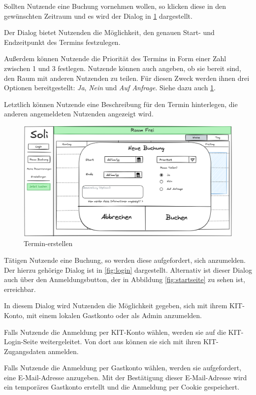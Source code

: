 Sollten Nutzende eine Buchung vornehmen wollen, so klicken diese in den gewünschten Zeitraum
und es wird der Dialog in \ref{fig:buchung} dargestellt.

Der Dialog bietet Nutzenden die Möglichkeit, den genauen Start- und Endzeitpunkt des Termins festzulegen.

Außerdem können Nutzende die Priorität des Termins in Form einer Zahl zwischen 1 und 3 festlegen.
Nutzende können auch angeben, ob sie bereit sind, den Raum mit anderen Nutzenden zu teilen.
Für diesen Zweck werden ihnen drei Optionen bereitgestellt: \textit{Ja}, \textit{Nein} und \textit{Auf Anfrage}.
Siehe dazu auch \ref{fig:buchung}.

Letztlich können Nutzende eine Beschreibung für den Termin hinterlegen, die anderen angemeldeten Nutzenden angezeigt wird.

\begin{figure}[ht]
    \centering
    \includegraphics[width=\textwidth]{figures/ui/buchungsdialog}
    \caption{Termin-erstellen}
    \label{fig:buchung}
\end{figure}
\clearpage

Tätigen Nutzende eine Buchung, so werden diese aufgefordert, sich anzumelden.
Der hierzu gehörige Dialog ist in \ref{fig:login} dargestellt.
Alternativ ist dieser Dialog auch über den Anmeldungsbutton, der in Abbildung \ref{fig:startseite} zu sehen ist, erreichbar.

In diesem Dialog wird Nutzenden die Möglichkeit gegeben, sich mit ihrem KIT-Konto, mit einem lokalen Gastkonto oder als Admin anzumelden.

Falls Nutzende die Anmeldung per KIT-Konto wählen, werden sie auf die KIT-Login-Seite weitergeleitet.
Von dort aus können sie sich mit ihren KIT-Zugangsdaten anmelden.

Falls Nutzende die Anmeldung per Gastkonto wählen, werden sie aufgefordert, eine E-Mail-Adresse anzugeben.
Mit der Bestätigung dieser E-Mail-Adresse wird ein temporäres Gastkonto erstellt und die Anmeldung per Cookie gespeichert.

